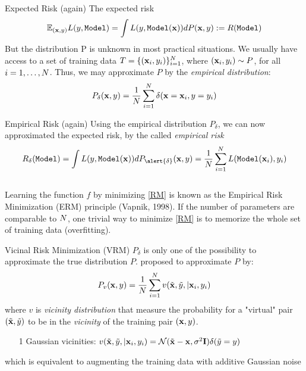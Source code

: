 \documentclass[handout,xcolor=pdftex,dvipsnames,table,mathserif]{beamer}
\begin{document}
\begin{frame}{Expected Risk (again)}
The expected risk
\begin{equation*}
 \mathbb{E}_{(\mathbf{x},y)}  L(y,\texttt{Model}) =  \int L(y,\texttt{Model} (\mathbf{x})) dP(\mathbf{x},y) := R(\texttt{Model} )
\end{equation*}
\pause
But the distribution P is \alert{unknown} in most practical situations. 
\pause
We usually have access to a set of training data $T=\{(\mathbf{x}_i,y_i) \}_{i=1}^{N}$, where $(\mathbf{x}_i,y_i)\sim P$, for all $i=1,\ldots,N$. Thus, we may approximate $P$ by the \emph{empirical distribution}:
\begin{equation*}
P_{\delta}(\mathbf{x},y) = \frac{1}{N}\sum_{i=1}^{N}\delta(\mathbf{x}=\mathbf{x}_i,y=y_i)
\end{equation*}
\end{frame}

\begin{frame}{Empirical Risk (again)}
Using the empirical distribution $P_{\delta}$, we can now approximated the expected risk, by the called \emph{empirical risk}
\begin{equation}\label{RM}
R_{\delta}(\texttt{Model} ) = \int \loss(y,\texttt{Model} (\x)) dP_{\alert{\delta}}(\x,y) = \frac{1}{\nsize}\sum_{i=1}^{\nsize}\loss(\texttt{Model}(\x_i),y_i)
\end{equation} \\
Learning the function $f$ by minimizing \eqref{RM} is known as the Empirical Risk Minimization (ERM) principle \cite{vapnik98} (Vapnik, 1998). If the number of parameters are comparable to $N$, one trivial way to minimize \eqref{RM} is to \alert{memorize} the whole set of training data (overfitting).
\end{frame}

\begin{frame}{Vicinal Risk Minimization (VRM)}
$P_{\delta}$ is only one of the possibility to approximate the true distribution $P$. \cite{chapelle2001vicinal} proposed to approximate $P$ by:
\begin{equation*}
P_{v}(\mathbf{x},y) = \frac{1}{N}\sum_{i=1}^{N}v(\tilde{\mathbf{x}},\tilde{y}, |\mathbf{x}_i,y_i)
\end{equation*}
where $v$ is \emph{vicinity distribution} that measure the probability for a "virtual" pair $(\tilde{\mathbf{x}},\tilde{y})$ to be in the \emph{vicinity} of the training pair $(\mathbf{x},y)$. \pause
\begin{enumerate}
\item[1]  Gaussian vicinities: $v(\tilde{\mathbf{x}},\tilde{y}, |\mathbf{x}_i,y_i)=\mathcal{N}(\tilde{\mathbf{x}}-\mathbf{x},\sigma^2\mathbf{I})\delta(\tilde{y}=y)$
\end{enumerate}
\pause
\alert{which is equivalent to augmenting the training data with additive Gaussian noise}
\end{frame}
\end{document}
